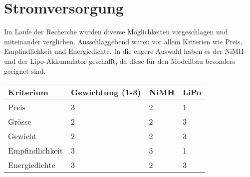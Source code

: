 \section{Stromversorgung}

Im Laufe der Recherche wurden diverse Möglichkeiten vorgeschlagen und miteinander verglichen. Ausschlaggebend waren vor allem Kriterien wie Preis, Empfindlichkeit und Energiedichte. In die engere Auswahl haben es der NiMH- und der Lipo-Akkumulator geschafft, da diese für den Modellbau besonders geeignet sind. 

\begin{table}[h]
\begin{tabular}{|p{4.5cm}|p{3.5cm}|p{2cm}|p{2cm}|}\hline
	
	\textbf{Kriterium}	& 	\textbf{Gewichtung (1-3)} & \textbf{NiMH} & \textbf{LiPo}\\\hline
	{Preis}	& 	{3} & {2} & {1}\\\hline
	{Grösse}	& 	{2} & {2} & {3}\\\hline
	{Gewicht}	& 	{2} & {2} & {3}\\\hline
	{Empfindlichkeit}	& 	{3} & {3} & {1}\\\hline
	{Energiedichte}	& 	{3} & {2} & {3}\\\hline

\end{tabular}\\
\end{table}